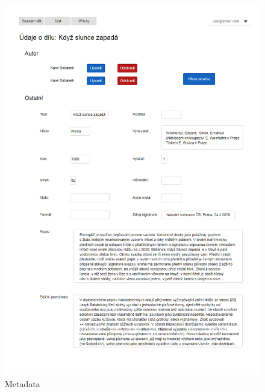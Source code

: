 \documentclass[thesis=B,czech]{FITthesis}[2012/06/26]
\begin{document}
    \begin {figure}[H]\centering
        \includegraphics[width=\textwidth]{images/metadata}
        \caption {Metadata}
        \label {fig:metadata}
    \end{figure}
    
\end{document}
